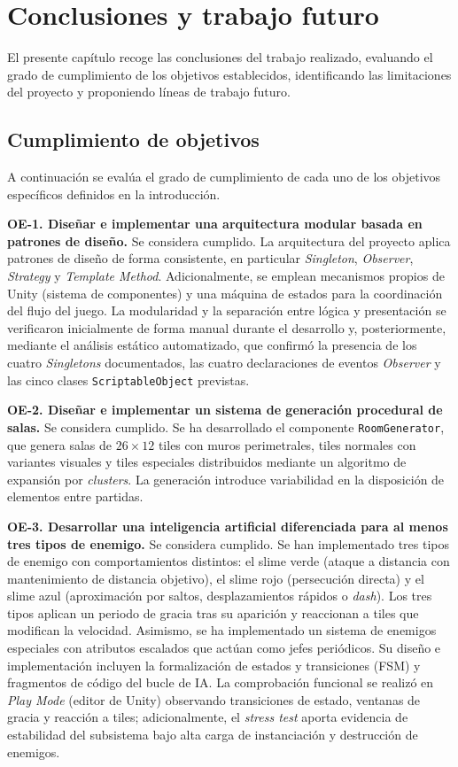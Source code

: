 ﻿\chapter{Conclusiones y trabajo futuro}


El presente capítulo recoge las conclusiones del trabajo realizado, evaluando el grado de cumplimiento de los objetivos establecidos, identificando las limitaciones del proyecto y proponiendo líneas de trabajo futuro.



\section{Cumplimiento de objetivos}


A continuación se evalúa el grado de cumplimiento de cada uno de los objetivos específicos definidos en la introducción.

\textbf{OE-1. Diseñar e implementar una arquitectura modular basada en patrones de diseño.} Se considera cumplido. La arquitectura del proyecto aplica patrones de diseño de forma consistente, en particular \textit{Singleton}, \textit{Observer}, \textit{Strategy} y \textit{Template Method}. Adicionalmente, se emplean mecanismos propios de Unity (sistema de componentes) y una máquina de estados para la coordinación del flujo del juego. La modularidad y la separación entre lógica y presentación se verificaron inicialmente de forma manual durante el desarrollo y, posteriormente, mediante el análisis estático automatizado, que confirmó la presencia de los cuatro \textit{Singletons} documentados, las cuatro declaraciones de eventos \textit{Observer} y las cinco clases \texttt{ScriptableObject} previstas.

\textbf{OE-2. Diseñar e implementar un sistema de generación procedural de salas.} Se considera cumplido. Se ha desarrollado el componente \texttt{RoomGenerator}, que genera salas de $26 \times 12$ tiles con muros perimetrales, tiles normales con variantes visuales y tiles especiales distribuidos mediante un algoritmo de expansión por \textit{clusters}. La generación introduce variabilidad en la disposición de elementos entre partidas.

\textbf{OE-3. Desarrollar una inteligencia artificial diferenciada para al menos tres tipos de enemigo.} Se considera cumplido. Se han implementado tres tipos de enemigo con comportamientos distintos: el slime verde (ataque a distancia con mantenimiento de distancia objetivo), el slime rojo (persecución directa) y el slime azul (aproximación por saltos, desplazamientos rápidos o \textit{dash}). Los tres tipos aplican un periodo de gracia tras su aparición y reaccionan a tiles que modifican la velocidad. Asimismo, se ha implementado un sistema de enemigos especiales con atributos escalados que actúan como jefes periódicos. Su diseño e implementación incluyen la formalización de estados y transiciones (FSM) y fragmentos de código del bucle de IA. La comprobación funcional se realizó en \textit{Play Mode} (editor de Unity) observando transiciones de estado, ventanas de gracia y reacción a tiles; adicionalmente, el \textit{stress test} aporta evidencia de estabilidad del subsistema bajo alta carga de instanciación y destrucción de enemigos.

